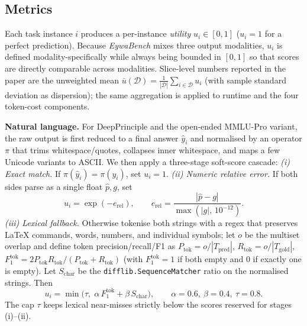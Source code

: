 \subsection{Metrics}
\label{sec:metrics}

Each task instance $i$ produces a per-instance \emph{utility} $u_i \in [0,1]$ ($u_i{=}1$ for a perfect prediction). Because \textit{EywaBench} mixes three output modalities, $u_i$ is defined modality-specifically while always being bounded in $[0,1]$ so that scores are directly comparable across modalities. Slice-level numbers reported in the paper are the unweighted mean $\bar{u}(\mathcal{D}) = \tfrac{1}{|\mathcal{D}|}\sum_{i\in\mathcal{D}} u_i$ (with sample standard deviation as dispersion); the same aggregation is applied to runtime and the four token-cost components.

\textbf{Natural language.}
For DeepPrinciple and the open-ended MMLU-Pro variant, the raw output is first reduced to a final answer $\hat{y}_i$ and normalised by an operator $\pi$ that trims whitespace/quotes, collapses inner whitespace, and maps a few Unicode variants to ASCII. We then apply a three-stage soft-score cascade:
\emph{(i) Exact match.} If $\pi(\hat{y}_i)=\pi(y_i)$, set $u_i{=}1$.
\emph{(ii) Numeric relative error.} If both sides parse as a single float $\hat{p},g$, set
\begin{equation}
u_i = \exp(-e_{\mathrm{rel}}), \qquad e_{\mathrm{rel}} = \frac{|\hat{p}-g|}{\max(|g|,\,10^{-12})}.
\label{eq:nl_numeric}
\end{equation}
\emph{(iii) Lexical fallback.} Otherwise tokenise both strings with a regex that preserves \LaTeX{} commands, words, numbers, and individual symbols; let $o$ be the multiset overlap and define token precision/recall/F1 as $P_\mathrm{tok}{=}o/|T_\mathrm{pred}|$, $R_\mathrm{tok}{=}o/|T_\mathrm{gold}|$, $F_1^{\mathrm{tok}}{=}2P_\mathrm{tok}R_\mathrm{tok}/(P_\mathrm{tok}{+}R_\mathrm{tok})$ (with $F_1^{\mathrm{tok}}{=}1$ if both empty and $0$ if exactly one is empty). Let $S_\mathrm{char}$ be the \texttt{difflib.SequenceMatcher} ratio on the normalised strings. Then
\begin{equation}
u_i = \min\!\bigl(\tau,\; \alpha\,F_1^{\mathrm{tok}} + \beta\,S_\mathrm{char}\bigr), \qquad \alpha{=}0.6,\ \beta{=}0.4,\ \tau{=}0.8.
\label{eq:nl_textual}
\end{equation}
The cap $\tau$ keeps lexical near-misses strictly below the scores reserved for stages (i)--(ii).

